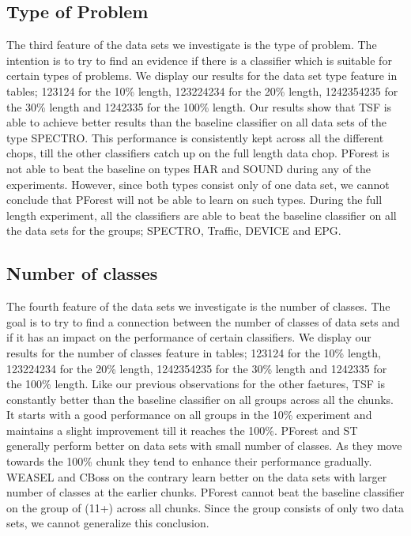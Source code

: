 \subsection{Type of Problem}
The third feature of the data sets we investigate is the type of problem.
The intention is to try to find an evidence if there is a classifier which is suitable for certain types of problems.
We display our results for the data set type feature in tables; 123124 for the 10\% length, 123224234 for the 20\% length, 1242354235 for the 30\% length and 1242335 for the 100\% length.
Our results show that TSF is able to achieve better results than the baseline classifier on all data sets of the type SPECTRO.
This performance is consistently kept across all the different chops, till the other classifiers catch up on the full length data chop.
PForest is not able to beat the baseline on types HAR and SOUND during any of the experiments.
However, since both types consist only of one data set, we cannot conclude that PForest will not be able to learn on such types.
During the full length experiment, all the classifiers are able to beat the baseline classifier on all the data sets for the groups; SPECTRO, Traffic, DEVICE and EPG.


\subsection{Number of classes}
The fourth feature of the data sets we investigate is the number of classes.
The goal is to try to find a connection between the number of classes of data sets and if it has an impact on the performance of certain classifiers.
We display our results for the number of classes feature in tables; 123124 for the 10\% length, 123224234 for the 20\% length, 1242354235 for the 30\% length and 1242335 for the 100\% length.
Like our previous observations for the other faetures, TSF is constantly better than the baseline classifier on all groups across all the chunks.
It starts with a good performance on all groups in the 10\% experiment and maintains a slight improvement till it reaches the 100\%.
PForest and ST generally perform better on data sets with small number of classes. As they move towards the 100\% chunk they tend to enhance their performance gradually.
WEASEL and CBoss on the contrary learn better on the data sets with larger number of classes at the earlier chunks.
PForest cannot beat the baseline classifier on the group of (11+) across all chunks. Since the group consists of only two data sets, we cannot generalize this conclusion.


